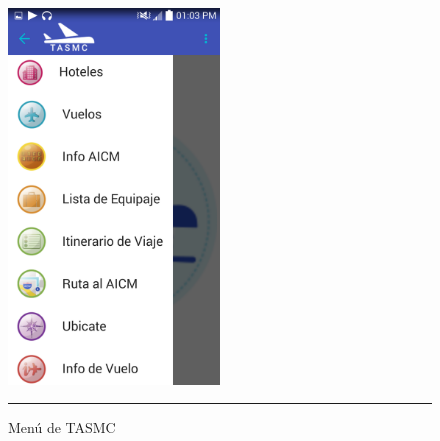 \begin{figure}[h]
	\centering
		\includegraphics[width=0.5\textwidth]{Figuras/menu.png}
		\rule{30em}{0.5pt}
	\caption[Menú de TASMC]{Menú de TASMC}
	\label{fig:menuTASMC}
\end{figure}
\clearpage

